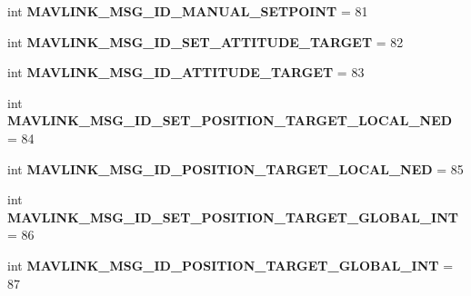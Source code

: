 \begin{DoxyCompactItemize}
\item 
\mbox{\label{namespacepymavlink_1_1dialects_1_1v10_a8e4aa7c3a374f96546760393d5df2b26}} 
int {\bfseries M\+A\+V\+L\+I\+N\+K\+\_\+\+M\+S\+G\+\_\+\+I\+D\+\_\+\+M\+A\+N\+U\+A\+L\+\_\+\+S\+E\+T\+P\+O\+I\+NT} = 81
\item 
\mbox{\label{namespacepymavlink_1_1dialects_1_1v10_a3327e6feeda828cd7151d7b1dc055f23}} 
int {\bfseries M\+A\+V\+L\+I\+N\+K\+\_\+\+M\+S\+G\+\_\+\+I\+D\+\_\+\+S\+E\+T\+\_\+\+A\+T\+T\+I\+T\+U\+D\+E\+\_\+\+T\+A\+R\+G\+ET} = 82
\item 
\mbox{\label{namespacepymavlink_1_1dialects_1_1v10_aa2bde97b9f9eff222b11c189cbdff888}} 
int {\bfseries M\+A\+V\+L\+I\+N\+K\+\_\+\+M\+S\+G\+\_\+\+I\+D\+\_\+\+A\+T\+T\+I\+T\+U\+D\+E\+\_\+\+T\+A\+R\+G\+ET} = 83
\item 
\mbox{\label{namespacepymavlink_1_1dialects_1_1v10_af222b4c54a9f349480b510253f3cfebe}} 
int {\bfseries M\+A\+V\+L\+I\+N\+K\+\_\+\+M\+S\+G\+\_\+\+I\+D\+\_\+\+S\+E\+T\+\_\+\+P\+O\+S\+I\+T\+I\+O\+N\+\_\+\+T\+A\+R\+G\+E\+T\+\_\+\+L\+O\+C\+A\+L\+\_\+\+N\+ED} = 84
\item 
\mbox{\label{namespacepymavlink_1_1dialects_1_1v10_ac22b6578a85a3c206c91e4bcb691256f}} 
int {\bfseries M\+A\+V\+L\+I\+N\+K\+\_\+\+M\+S\+G\+\_\+\+I\+D\+\_\+\+P\+O\+S\+I\+T\+I\+O\+N\+\_\+\+T\+A\+R\+G\+E\+T\+\_\+\+L\+O\+C\+A\+L\+\_\+\+N\+ED} = 85
\item 
\mbox{\label{namespacepymavlink_1_1dialects_1_1v10_a194903dd4d7e1b9c90ecfc4324944ecc}} 
int {\bfseries M\+A\+V\+L\+I\+N\+K\+\_\+\+M\+S\+G\+\_\+\+I\+D\+\_\+\+S\+E\+T\+\_\+\+P\+O\+S\+I\+T\+I\+O\+N\+\_\+\+T\+A\+R\+G\+E\+T\+\_\+\+G\+L\+O\+B\+A\+L\+\_\+\+I\+NT} = 86
\item 
\mbox{\label{namespacepymavlink_1_1dialects_1_1v10_a002b16f09173a96fd3d40f1a14acee2d}} 
int {\bfseries M\+A\+V\+L\+I\+N\+K\+\_\+\+M\+S\+G\+\_\+\+I\+D\+\_\+\+P\+O\+S\+I\+T\+I\+O\+N\+\_\+\+T\+A\+R\+G\+E\+T\+\_\+\+G\+L\+O\+B\+A\+L\+\_\+\+I\+NT} = 87
\item 

\end{DoxyCompactItemize}
